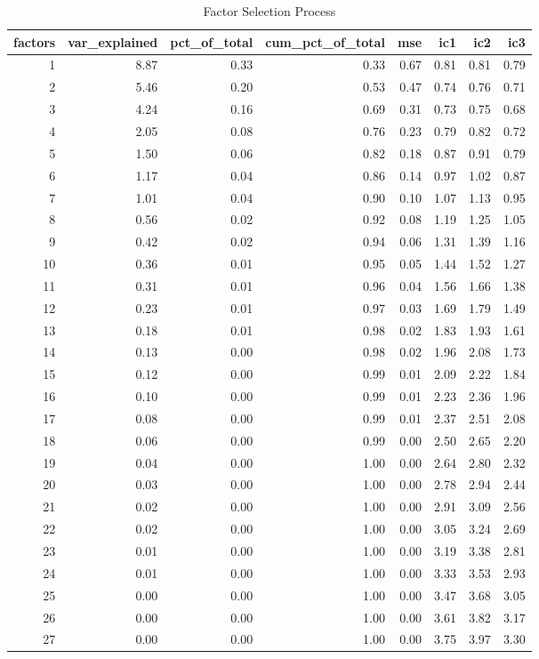 \documentclass[11pt, letterpaper]{article}\usepackage[]{graphicx}\usepackage[]{color}
\begin{document}
\begin{table}[!h]
\centering
\begingroup\footnotesize
\begin{tabular}{rrrrrrrr}
  \hline
factors & var\_explained & pct\_of\_total & cum\_pct\_of\_total & mse & ic1 & ic2 & ic3 \\ 
  \hline
  1 & 8.87 & 0.33 & 0.33 & 0.67 & 0.81 & 0.81 & 0.79 \\ 
    2 & 5.46 & 0.20 & 0.53 & 0.47 & 0.74 & 0.76 & 0.71 \\ 
    3 & 4.24 & 0.16 & 0.69 & 0.31 & 0.73 & 0.75 & 0.68 \\ 
    4 & 2.05 & 0.08 & 0.76 & 0.23 & 0.79 & 0.82 & 0.72 \\ 
    5 & 1.50 & 0.06 & 0.82 & 0.18 & 0.87 & 0.91 & 0.79 \\ 
    6 & 1.17 & 0.04 & 0.86 & 0.14 & 0.97 & 1.02 & 0.87 \\ 
    7 & 1.01 & 0.04 & 0.90 & 0.10 & 1.07 & 1.13 & 0.95 \\ 
    8 & 0.56 & 0.02 & 0.92 & 0.08 & 1.19 & 1.25 & 1.05 \\ 
    9 & 0.42 & 0.02 & 0.94 & 0.06 & 1.31 & 1.39 & 1.16 \\ 
   10 & 0.36 & 0.01 & 0.95 & 0.05 & 1.44 & 1.52 & 1.27 \\ 
   11 & 0.31 & 0.01 & 0.96 & 0.04 & 1.56 & 1.66 & 1.38 \\ 
   12 & 0.23 & 0.01 & 0.97 & 0.03 & 1.69 & 1.79 & 1.49 \\ 
   13 & 0.18 & 0.01 & 0.98 & 0.02 & 1.83 & 1.93 & 1.61 \\ 
   14 & 0.13 & 0.00 & 0.98 & 0.02 & 1.96 & 2.08 & 1.73 \\ 
   15 & 0.12 & 0.00 & 0.99 & 0.01 & 2.09 & 2.22 & 1.84 \\ 
   16 & 0.10 & 0.00 & 0.99 & 0.01 & 2.23 & 2.36 & 1.96 \\ 
   17 & 0.08 & 0.00 & 0.99 & 0.01 & 2.37 & 2.51 & 2.08 \\ 
   18 & 0.06 & 0.00 & 0.99 & 0.00 & 2.50 & 2.65 & 2.20 \\ 
   19 & 0.04 & 0.00 & 1.00 & 0.00 & 2.64 & 2.80 & 2.32 \\ 
   20 & 0.03 & 0.00 & 1.00 & 0.00 & 2.78 & 2.94 & 2.44 \\ 
   21 & 0.02 & 0.00 & 1.00 & 0.00 & 2.91 & 3.09 & 2.56 \\ 
   22 & 0.02 & 0.00 & 1.00 & 0.00 & 3.05 & 3.24 & 2.69 \\ 
   23 & 0.01 & 0.00 & 1.00 & 0.00 & 3.19 & 3.38 & 2.81 \\ 
   24 & 0.01 & 0.00 & 1.00 & 0.00 & 3.33 & 3.53 & 2.93 \\ 
   25 & 0.00 & 0.00 & 1.00 & 0.00 & 3.47 & 3.68 & 3.05 \\ 
   26 & 0.00 & 0.00 & 1.00 & 0.00 & 3.61 & 3.82 & 3.17 \\ 
   27 & 0.00 & 0.00 & 1.00 & 0.00 & 3.75 & 3.97 & 3.30 \\ 
   \hline
\end{tabular}
\endgroup
\caption{Factor Selection Process} 
\end{table}
\end{document}
